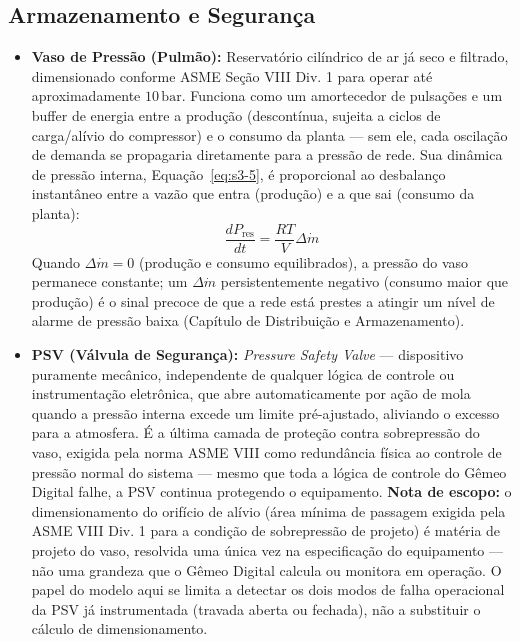 \documentclass[12pt,a4paper]{article}
\numberwithin{equation}{section}
\numberwithin{table}{section}
\numberwithin{figure}{section}
\begin{document}
	\subsection{\textbf{Armazenamento e Segurança}}
	\begin{itemize}
		\item \textbf{Vaso de Pressão (Pulmão):} Reservatório cilíndrico de ar já seco e filtrado, dimensionado conforme ASME Seção VIII Div. 1 para operar até aproximadamente $10\,\text{bar}$. Funciona como um amortecedor de pulsações e um buffer de energia entre a produção (descontínua, sujeita a ciclos de carga/alívio do compressor) e o consumo da planta — sem ele, cada oscilação de demanda se propagaria diretamente para a pressão de rede. Sua dinâmica de pressão interna, Equação~\eqref{eq:s3-5}, é proporcional ao desbalanço instantâneo entre a vazão que entra (produção) e a que sai (consumo da planta):
		\begin{equation}\label{eq:s3-5}
 \frac{dP_{\text{res}}}{dt} = \frac{R T}{V} \Delta \dot{m}
\end{equation}
		Quando $\Delta \dot{m} = 0$ (produção e consumo equilibrados), a pressão do vaso permanece constante; um $\Delta \dot{m}$ persistentemente negativo (consumo maior que produção) é o sinal precoce de que a rede está prestes a atingir um nível de alarme de pressão baixa (Capítulo de Distribuição e Armazenamento).
		\item \textbf{PSV (Válvula de Segurança):} \textit{Pressure Safety Valve} — dispositivo puramente mecânico, independente de qualquer lógica de controle ou instrumentação eletrônica, que abre automaticamente por ação de mola quando a pressão interna excede um limite pré-ajustado, aliviando o excesso para a atmosfera. É a última camada de proteção contra sobrepressão do vaso, exigida pela norma ASME VIII como redundância física ao controle de pressão normal do sistema — mesmo que toda a lógica de controle do Gêmeo Digital falhe, a PSV continua protegendo o equipamento. \textbf{Nota de escopo:} o dimensionamento do orifício de alívio (área mínima de passagem exigida pela ASME VIII Div. 1 \cite{asme8} para a condição de sobrepressão de projeto) é matéria de projeto do vaso, resolvida uma única vez na especificação do equipamento — não uma grandeza que o Gêmeo Digital calcula ou monitora em operação. O papel do modelo aqui se limita a detectar os dois modos de falha operacional da PSV já instrumentada (travada aberta ou fechada), não a substituir o cálculo de dimensionamento.
	\end{itemize}
	
\end{document}
